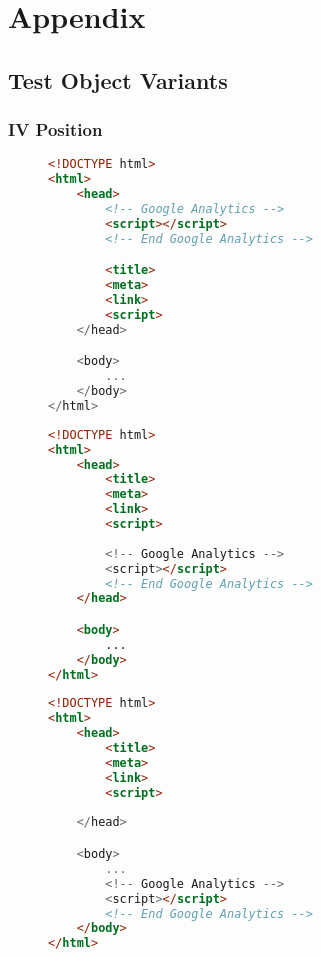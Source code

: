 \chapter{Appendix}

\section{Test Object Variants}


\subsection{IV Position}

\begin{sidewaysfigure}
\begin{multicols}{3}
\begin{center}
\begin{lstlisting}[caption={Position 1}, language=html, numbers=none]
<!DOCTYPE html>
<html>
    <head>
        <!-- Google Analytics -->
        <script></script>
        <!-- End Google Analytics -->

        <title>
        <meta>
        <link>
        <script>
    </head>

    <body>
        ...
    </body>
</html>
\end{lstlisting}
\end{center}

\columnbreak

\begin{center}
\begin{lstlisting}[caption={Position 2}, language=html, numbers=none]
<!DOCTYPE html>
<html>
    <head>
        <title>
        <meta>
        <link>
        <script>
        
        <!-- Google Analytics -->
        <script></script>
        <!-- End Google Analytics -->
    </head>

    <body>
        ...
    </body>
</html>
\end{lstlisting}
\end{center}

\columnbreak

\begin{center}
\begin{lstlisting}[caption={Position 3}, language=html, numbers=none]
<!DOCTYPE html>
<html>
    <head>
        <title>
        <meta>
        <link>
        <script>
        
    </head>

    <body>
        ...
        <!-- Google Analytics -->
        <script></script>
        <!-- End Google Analytics -->
    </body>
</html>
\end{lstlisting}
\end{center}
\end{multicols}
\end{sidewaysfigure}


